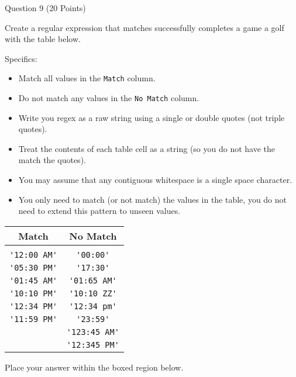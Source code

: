 \documentclass{article}
\begin{document}
\begin{minipage}{\textwidth}
    \noindent
    Question 9 (20 Points)
    \vspace{0.5cm}

    \noindent
    Create a regular expression that matches successfully completes a game a golf with the table below.

    Specifics:
    \begin{itemize}
        \item Match all values in the \verb|Match| column.
        \item Do not match any values in the \verb|No Match| column.
        \item Write you regex as a raw string using a single or double quotes (not triple quotes).
        \item Treat the contents of each table cell as a string (so you do not have the match the quotes).
        \item You may assume that any contiguous whitespace is a single space character.
        \item You only need to match (or not match) the values in the table, you do not need to extend this pattern to unseen values.
    \end{itemize}


    \begin{center}
        \begin{tabular}{ cc }
            Match & No Match \\
            \hline \\
            \verb|'12:00 AM'| & \verb|'00:00'| \\
            \verb|'05:30 PM'| & \verb|'17:30'| \\
            \verb|'01:45 AM'| & \verb|'01:65 AM'| \\
            \verb|'10:10 PM'| & \verb|'10:10 ZZ'| \\
            \verb|'12:34 PM'| & \verb|'12:34 pm'| \\
            \verb|'11:59 PM'| & \verb|'23:59'| \\
            & \verb|'123:45 AM'| \\
            & \verb|'12:345 PM'| \\
        \end{tabular}
    \end{center}

    \vspace{0.25cm}
    Place your answer within the boxed region below.
    \vspace{0.25cm}


\end{minipage}
\end{document}
